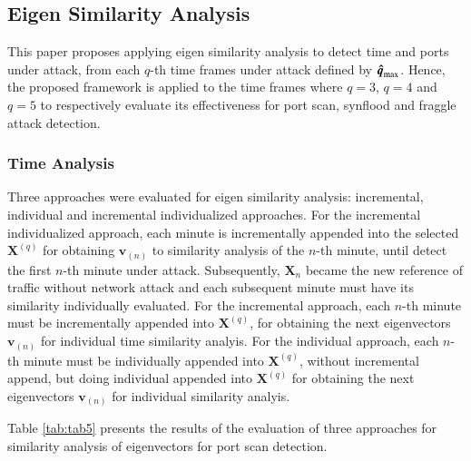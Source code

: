 \documentclass[review]{elsarticle}
\begin{document}
\subsection{Eigen Similarity Analysis}
\label{sec:EigenSimilarityAnalysis}

This paper proposes applying eigen similarity analysis to detect time and ports under attack, from each $q$-th time frames under attack defined by $\rm{\boldsymbol{\hat{q}}}_{\rm max}$. Hence, the proposed framework is applied to the time frames where $q=3$, $q=4$ and $q=5$ to respectively evaluate its effectiveness for port scan, synflood and fraggle attack detection.

\subsubsection{Time Analysis}
\label{sec:TimeAnalysis}

Three approaches were evaluated for eigen similarity analysis: incremental, individual and incremental individualized approaches. For the incremental individualized approach, each minute is incrementally appended into the selected $\boldsymbol{X}^{(q)}$ for obtaining $\boldsymbol{v}_{(n)}$ to similarity analysis of the $n$-th minute, until detect the first $n$-th minute under attack. Subsequently, $\boldsymbol{X}_n$ became the new reference of traffic without network attack and each subsequent minute must have its similarity individually evaluated. For the incremental approach, each $n$-th minute must be incrementally appended into $\boldsymbol{X}^{(q)}$, for obtaining the next eigenvectors $\boldsymbol{v}_{(n)}$ for individual time similarity analyis. For the individual approach, each $n$-th minute must be individually appended into $\boldsymbol{X}^{(q)}$, without incremental append, but doing individual appended into $\boldsymbol{X}^{(q)}$ for obtaining the next eigenvectors $\boldsymbol{v}_{(n)}$ for individual similarity analyis.

Table \ref{tab:tab5} presents the results of the evaluation of three approaches for similarity analysis of eigenvectors for port scan detection.
\end{document}

